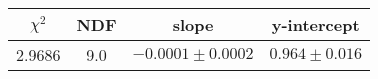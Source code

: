 \begin{tabular}{|c|c|c|c|}

\hline
$\chi^{2}$ & NDF & slope & y-intercept  \\
\hline
2.9686 & 9.0 & $-0.0001\pm0.0002$ & $0.964\pm0.016$ \\
\hline

\end{tabular}